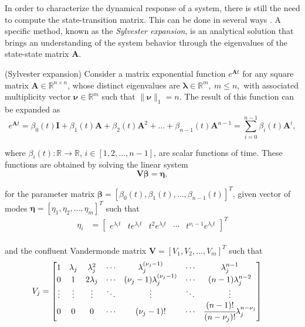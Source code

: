 \documentclass[a4paper,11pt]{book}
\numberwithin{figure}{chapter}
\numberwithin{equation}{chapter}
\numberwithin{table}{chapter}
\newtheorem{theorem}{Theorem}[chapter]
\theoremstyle{definition}
\newcounter{boxed-theorem}
\newenvironment{boxed-theorem}[1]
{\colorlet{shadecolor}{pastelBlue2!10} \begin{shaded} \begin{theorem}{#1}}
{\end{theorem} \end{shaded}}
\newcounter{boxed-definition}
\newcounter{boxed-example}
\begin{document}
In order to characterize the dynamical response of a system, there is still the need to compute the state-transition matrix. This can be done in several ways \cite{Moler_VanLoan:2003}. A specific method, known as the \textit{Sylvester expansion}, is an analytical solution that brings an understanding of the system behavior through the eigenvalues of the state-state matrix $\bm{A}$.

\begin{boxed-theorem}{(Sylvester expansion)} \label{th:sylvester01}
    Consider a matrix exponential function $e^{\bm{A} t}$ for any square matrix $\bm{A} \in \mathbb{R}^{n \times n}$, whose distinct eigenvalues are $\bm{\lambda} \in \mathbb{R}^{m},\ m \leq n,$ with associated multiplicity vector $\bm{\nu} \in \mathbb{R}^m$ such that $\| \bm{\nu} \|_1 = n$. The result of this function can be expanded as
    \begin{equation} \label{eq:sylvester01}
        e^{\bm{A} t} = \beta_0(t) \bm{I} + \beta_1(t) \bm{A} + \beta_2(t) \bm{A}^2 + ... + \beta_{n-1}(t) \bm{A}^{n-1} = \sum_{i=0}^{n-1} \beta_i(t) \bm{A}^i
    ,\end{equation} 
    
    \noindent where $\beta_i(t) : \mathbb{R} \rightarrow \mathbb{R}$, $i \in [1,2,...,n-1]$, are scalar functions of time. These functions are obtained by solving the linear system
    \begin{equation} \label{eq:sylvester02}
        \bm{V} \bm{\beta} = \bm{\eta}
    ,\end{equation} 
    
    \noindent for the parameter matrix $\bm{\beta} = [\beta_0(t), \beta_1(t), ..., \beta_{n-1}(t)]^T$, given vector of modes $\bm{\eta} = [\eta_1, \eta_2, ..., \eta_m]^T$ such that
    \begin{align*}
        \eta_i & = \begin{bmatrix} e^{\lambda_i t} & te^{\lambda_i t} & t^2e^{\lambda_i t} & \cdots & t^{\nu_i-1}e^{\lambda_i t} \end{bmatrix}^T \\
    \end{align*}
    
	\noindent and the confluent Vandermonde matrix $\bm{V} = [V_1, V_2, ..., V_m]^T$ such that
    \begin{align*}
        V_j     & = \begin{bmatrix}
            1 & \lambda_j & \lambda_j^2 & \cdots & \lambda_j^{(\nu_j - 1)} & \cdots & \lambda_j^{n-1} \\
            0 & 1 & 2\lambda_j & \cdots & (\nu_j - 1) \lambda_j^{(\nu_j - 1)} & \cdots & (n-1)\lambda_j^{n-2} \\
            \vdots & \vdots & \vdots & \ddots & \vdots & \ddots & \vdots \\
            0 & 0 & 0 & \cdots & (\nu_j - 1)! & \cdots & \cfrac{(n - 1)!}{(n - \nu_j)!}\lambda_j^{n-\nu_j} \\
        \end{bmatrix}\
    \end{align*} 
\end{boxed-theorem}
\end{document}

